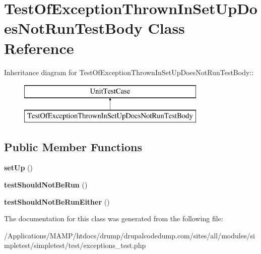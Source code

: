 \hypertarget{class_test_of_exception_thrown_in_set_up_does_not_run_test_body}{
\section{TestOfExceptionThrownInSetUpDoesNotRunTestBody Class Reference}
\label{class_test_of_exception_thrown_in_set_up_does_not_run_test_body}
}
Inheritance diagram for TestOfExceptionThrownInSetUpDoesNotRunTestBody::\begin{figure}[H]
\begin{center}
\leavevmode
\includegraphics[height=2cm]{class_test_of_exception_thrown_in_set_up_does_not_run_test_body}
\end{center}
\end{figure}
\subsection*{Public Member Functions}
\begin{DoxyCompactItemize}
\item 
\hypertarget{class_test_of_exception_thrown_in_set_up_does_not_run_test_body_a5c949f31295e4def2d5991c8671f8f9a}{
{\bfseries setUp} ()}
\label{class_test_of_exception_thrown_in_set_up_does_not_run_test_body_a5c949f31295e4def2d5991c8671f8f9a}

\item 
\hypertarget{class_test_of_exception_thrown_in_set_up_does_not_run_test_body_ae32b9c8a8fb7c414a1a3f6489b54ab80}{
{\bfseries testShouldNotBeRun} ()}
\label{class_test_of_exception_thrown_in_set_up_does_not_run_test_body_ae32b9c8a8fb7c414a1a3f6489b54ab80}

\item 
\hypertarget{class_test_of_exception_thrown_in_set_up_does_not_run_test_body_a0c188e31b815e74fb52ca413db2ffa99}{
{\bfseries testShouldNotBeRunEither} ()}
\label{class_test_of_exception_thrown_in_set_up_does_not_run_test_body_a0c188e31b815e74fb52ca413db2ffa99}

\end{DoxyCompactItemize}


The documentation for this class was generated from the following file:\begin{DoxyCompactItemize}
\item 
/Applications/MAMP/htdocs/drump/drupalcodedump.com/sites/all/modules/simpletest/simpletest/test/exceptions\_\-test.php\end{DoxyCompactItemize}
